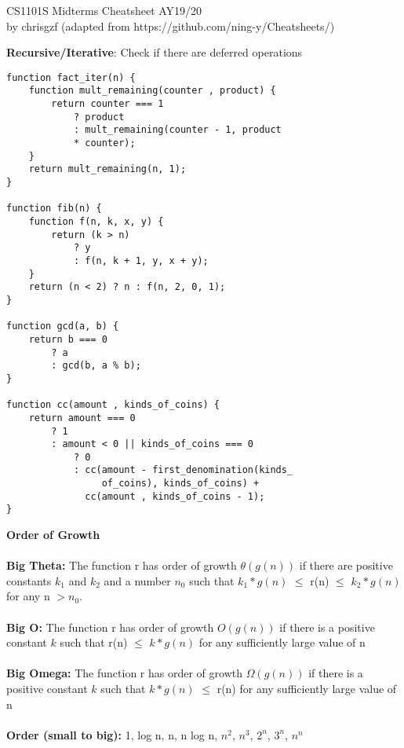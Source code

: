 \documentclass[a4paper]{article} \usepackage[backend=biber, style=numeric, sorting=none]{biblatex}
\begin{document}
\setlength\parindent{0pt} %
\scriptsize
{}

\begin{center}
{\large CS1101S Midterms Cheatsheet AY19/20}\\{by chrisgzf (adapted from https://github.com/ning-y/Cheatsheets/)}
\end{center}
    \begin{multicols*}{4}

{\small\textbf{Recursive/Iterative}}: Check if there are deferred operations

\begin{verbatim}
function fact_iter(n) {
    function mult_remaining(counter , product) {
        return counter === 1
            ? product
            : mult_remaining(counter - 1, product
            * counter);
    }
    return mult_remaining(n, 1);
}

function fib(n) {
    function f(n, k, x, y) {
        return (k > n)
            ? y
            : f(n, k + 1, y, x + y);
    }
    return (n < 2) ? n : f(n, 2, 0, 1);
}

function gcd(a, b) {
    return b === 0
        ? a
        : gcd(b, a % b);
}

function cc(amount , kinds_of_coins) {
    return amount === 0
        ? 1
        : amount < 0 || kinds_of_coins === 0
            ? 0
            : cc(amount - first_denomination(kinds_
                 of_coins), kinds_of_coins) +
              cc(amount , kinds_of_coins - 1);
}
\end{verbatim}

{\small\textbf{Order of Growth}}
\\ \\
\textbf{Big Theta:} The function r has order of growth $\theta(g(n))$ if there are positive constants $k_{1}$ and $k_{2}$ and a number $n_{0}$ such that $k_{1}*g(n)$ $\leq$ r(n) $\leq$ $k_{2}*g(n)$ for any n $> n_{0}$.
\\ \\
\textbf{Big O:} The function r has order of growth $O(g(n))$ if there is a positive constant $k$ such that r(n) $\leq$ $k*g(n)$ for any sufficiently large value of n
\\ \\
\textbf{Big Omega:} The function r has order of growth $\Omega(g(n))$ if there is a positive constant $k$ such that $k*g(n)$ $\leq$ r(n) for any sufficiently large value of n
\\ \\
\textbf{Order (small to big):} 1, log n, n, n log n, $n^{2}$, $n^{3}$, $2^{n}$, $3^{n}$, $n^{n}$ \\


\end{multicols*}
\end{document}
